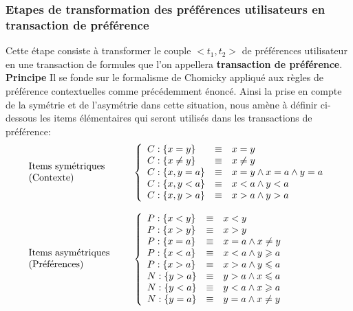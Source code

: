 \documentclass[11pt,a4paper]{article}
\theoremstyle{definition}
\begin{document}
    
   \subsubsection{Etapes de transformation des préférences utilisateurs en transaction de préférence}
   
      Cette étape consiste à transformer le couple $<t_{1},t_{2}>$ de préférences utilisateur en une transaction de formules que l'on appellera \textbf{transaction de préférence}.\\ 
      \textbf{Principe}
      Il se fonde sur le formalisme de Chomicky appliqué aux règles de préférence contextuelles comme précédemment énoncé. Ainsi la prise en compte de la symétrie et de l'asymétrie dans cette situation, nous amène à définir ci-dessous les items élémentaires qui seront utilisés dans les transactions de préférence:\\


      \[
      \begin{array}{l l}
      \parbox{3.5cm}{Items symétriques\\ (Contexte)}&
	  \left\{
		  \begin{array}{l c l}
		     C:\{x=y\}&\equiv& x=y\\
		     C:\{x\neq y\}&\equiv& x\neq y\\
		   	 C:\{x,y=a\}&\equiv& x=y\wedge x=a\wedge y=a\\
		   	 C:\{x,y<a\}&\equiv& x<a\wedge y<a\\
		   	 C:\{x,y>a\}&\equiv& x>a\wedge y>a
	   	 \end{array}
   	 \right.\\
	&\\
      \parbox{3.5cm}{Items asymétriques\\ (Préférences)}&
	  \left\{
		  \begin{array}{l c l}   	 
		   	 P:\{x<y\}&\equiv& x<y\\
		   	 P:\{x>y\}&\equiv& x>y\\
		   	 P:\{x=a\} &\equiv& x=a \wedge x\neq y \\
		   	 P:\{x<a\} &\equiv& x<a \wedge y\geqslant a\\
			 P:\{x>a\} &\equiv& x>a \wedge y\leqslant a\\
			 
			 N:\{y>a\} &\equiv& y>a \wedge x\leqslant a\\
			 N:\{y<a\} &\equiv& y<a \wedge x\geqslant a\\
		   	 N:\{y=a\} &\equiv& y=a \wedge x\neq y\\	 
	   	 \end{array}
   	 \right.
   	 \end{array}
   	 \]		   	 	 		 
	 
\end{document}
